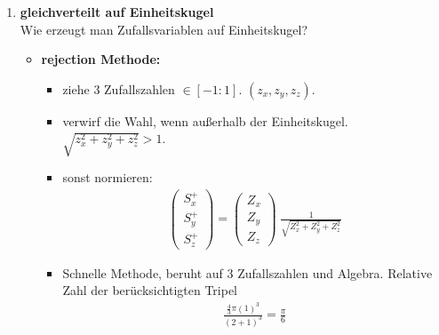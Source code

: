 \documentclass[12pt]{article}
\begin{document}
\begin{enumerate}
		\item \textbf{gleichverteilt auf Einheitskugel} \\
		Wie erzeugt man Zufallsvariablen auf Einheitskugel?

\begin{itemize}
\item \textbf{rejection Methode:}
			
			\begin{itemize}
						\item  ziehe 3 Zufallszahlen $\in [ -1:1]$. $(z_x, 		z_y, z_z)$. 
						\item verwirf die Wahl, wenn außerhalb der Einheitskugel. $\sqrt{z_x^2 + z_y^2 +z_z^2}>1$.
						\item sonst normieren: 
\begin{align}
\begin{pmatrix} S_x^+ \\ S_y^+ \\ S_z ^+\end{pmatrix} = \begin{pmatrix} Z_x \\ Z_y \\ Z_z \end{pmatrix} \; \frac{1}{\sqrt{Z_x^2 + Z_y^2 + Z_z^2}}
\end{align}
						\item Schnelle Methode, beruht auf 3 Zufallszahlen und Algebra. Relative Zahl der berücksichtigten Tripel
\begin{align*}
\frac{\frac{4}{3} \pi (1)^3}{(2+1)^3} = \frac{\pi }{6}
\end{align*}
\end{itemize}		
		

\end{itemize}
\end{enumerate}
\end{document}
